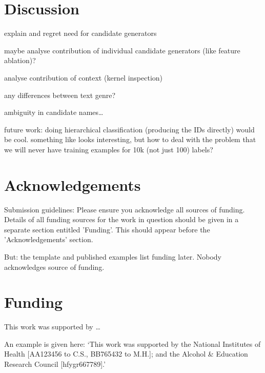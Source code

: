 \documentclass{bioinfo}
\begin{document}
\section{Discussion}

explain and regret need for candidate generators

maybe analyse contribution of individual candidate generators (like feature ablation)?

analyse contribution of context (kernel inspection)

any differences between text genre?

ambiguity in candidate names\dots

future work: doing hierarchical classification (producing the IDs directly) would be cool. something like \cite{guo-et-al:2018} looks interesting, but how to deal with the problem that we will never have training examples for 10k (not just 100) labels?



\section*{Acknowledgements}

Submission guidelines:
Please ensure you acknowledge all sources of funding.
Details of all funding sources for the work in question should be given in a separate section entitled 'Funding'. This should appear before the 'Acknowledgements' section.

But: the template and published examples list funding later.
Nobody acknowledges source of funding.
\vspace*{-12pt}



\section*{Funding}

This work was supported by \dots

An example is given here: ‘This work was supported by the National Institutes of Health [AA123456 to C.S., BB765432 to M.H.]; and the Alcohol \& Education Research Council [hfygr667789].’
\vspace*{-12pt}





\end{document}
